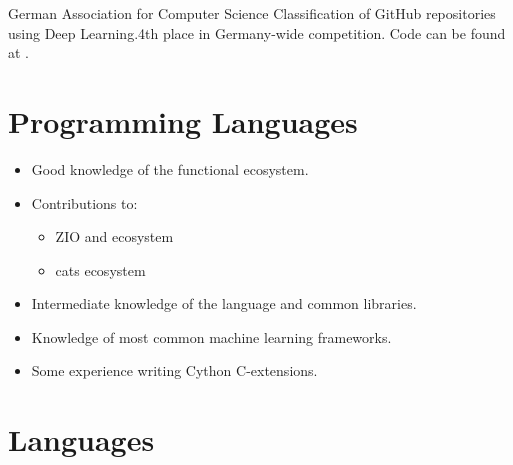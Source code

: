 \documentclass[10pt,a4paper,sans]{moderncv}
\begin{document}
        {}
        {German Association for Computer Science}
        {}
        {}
        {Classification of GitHub repositories using Deep Learning.\newline 4th place in Germany-wide competition.
         \newline Code can be found at .}

\section{Programming Languages}
 {
  \begin{itemize}
    \item Good knowledge of the functional ecosystem.
    \item Contributions to:
    \begin{itemize}
        \item ZIO and ecosystem
        \item cats ecosystem
        \vspace{-0.3cm}
    \end{itemize}
  \end{itemize}
}

 {
  \begin{itemize}
      \item Intermediate knowledge of the language and common libraries.
      \vspace{-0.3cm}
  \end{itemize}
}

 {
  \begin{itemize}
    \item Knowledge of most common machine learning frameworks.
    \item Some experience writing Cython C-extensions.
    \vspace{-0.3cm}
  \end{itemize}
}

\section{Languages}
\end{document}
